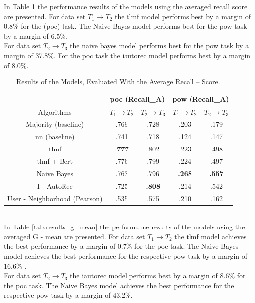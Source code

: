 \noindent In Table \ref{tab:results_recall_mean} the performance results of the models using the averaged recall score are presented. For data set $T_1 \to T_2$ the \acrshort{tlmf} model performs best by a margin of 0.8\% for the (\acrshort{poc}) task. The Naive Bayes model performs best for the \acrshort{pow} task by a margin of 6.5\%. \\
For data set $T_2 \to T_3$ the naive bayes model performs best for the \acrshort{pow} task by a margin of 37.8\%. For the \acrshort{poc} task the \acrshort{iautorec} model performs best by a margin of 8.0\%.

\begin{table}[h!]
    \centering
    \begin{tabular}{|c|c|c|c|c|}
    \hline
     & \multicolumn{2}{|c|}{\acrshort{poc} (Recall_A)} & \multicolumn{2}{|c|}{\acrshort{pow} (Recall_A)} \\
     \hline
    Algorithms & $T_1 \to T_2$ & $T_2 \to T_3$ & $T_1 \to T_2$ & $T_2 \to T_3$\\
    \hline  Majority (baseline) & .769 & .728 & .203 & .179 \\ 
    \acrshort{nn} (baseline) & .741 & .718 & .124 & .147\\
    \acrshort{tlmf} & \textbf{.777} & .802 & .223 & .498 \\
    \acrshort{tlmf} + Bert & .776 & .799 & .224 & .497\\
    Naive Bayes & .763 & .796 & \textbf{.268} & \textbf{.557} \\
    I - AutoRec & .725 & \textbf{.808} & .214 & .542\\
    User - Neighborhood (Pearson) & .535 & .575 & .210 & .162\\
    \hline
    \end{tabular}
    \caption{Results of the Models, Evaluated With the Average Recall – Score.}
    \label{tab:results_recall_mean}
\end{table}\\

\noindent In Table \ref{tab:results_g_mean} the performance results of the models using the averaged G - mean are presented. For data set $T_1 \to T_2$ the \acrshort{tlmf} model achieves the best performance by a margin of 0.7\% for the  \acrshort{poc} task. The Naive Bayes model achieves the best performance for the respective \acrshort{pow} task by a margin of 16.6\% .\\
For data set $T_2 \to T_3$ the \acrshort{iautorec} model performs best by a margin of 8.6\% for the  \acrshort{poc} task. The Naive Bayes model achieves the best performance for the respective \acrshort{pow} task by a margin of 43.2\%. 

